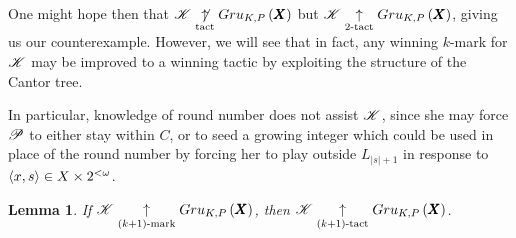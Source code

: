 \documentclass{amsart}
\newtheorem{lemma}[theorem]{Lemma}
\theoremstyle{definition}
\begin{document}
One might hope then that $\mathscr{K}\underset{\text{tact}}{\not\uparrow}Gru_{K,P}\left({\pmb X}\right)$ but
$\mathscr{K}\underset{2\text{-tact}}{\uparrow}Gru_{K,P}\left({\pmb X}\right)$, giving us our counterexample.
However, we will see that in fact, any winning $k$-mark for $\mathscr{K}$ may
be improved to a winning tactic by exploiting the structure of the Cantor tree.

In particular, knowledge of round number does not assist $\mathscr{K}$,
since she may force $\mathscr{P}$ to either stay within $C$, or to seed a growing
integer which could be used in place of the round number
by forcing her to play outside $L_{|s|+1}$ in response to
$\langle x,s\rangle\in X\times 2^{<\omega}$.

\begin{lemma}
  If $\mathscr{K}\underset{(k+1)\text{-mark}}{\uparrow}Gru_{K,P}\left({\pmb X}\right)$, then
  $\mathscr{K}\underset{(k+1)\text{-tact}}{\uparrow}Gru_{K,P}\left({\pmb X}\right)$.
\end{lemma}
\end{document}
